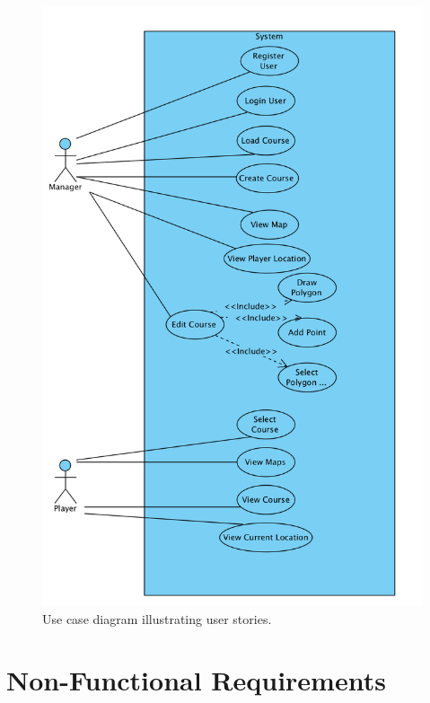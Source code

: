 \documentclass{article}
\begin{document}
    \begin{figure}[h!]
        \centering
        \includegraphics[scale=0.6]{UsecaseDiagram}
        \caption{Use case diagram illustrating user stories.}
        \label{fig:usecase}
    \end{figure}

    \newpage


    \section{Non-Functional Requirements}
\end{document}
